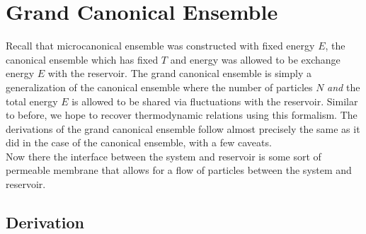 \documentclass{article}
\begin{document}
{\section{Grand Canonical Ensemble}

Recall that microcanonical ensemble was constructed with fixed energy $E$, the canonical ensemble which has fixed $T$ and energy was allowed to be exchange energy $E$ with the reservoir. The grand canonical ensemble is simply a generalization of the canonical ensemble where the number of particles $N$ \textit{and} the total energy $E$ is allowed to be shared via fluctuations with the reservoir. Similar to before, we hope to recover thermodynamic relations using this formalism. The derivations of the grand canonical ensemble follow almost precisely the same as it did in the case of the canonical ensemble, with a few caveats. \\

Now there the interface between the system and reservoir is some sort of permeable membrane that allows for a flow of particles between the system and reservoir.

\begin{center}
\end{center}

\subsection{Derivation}

}
\end{document}
